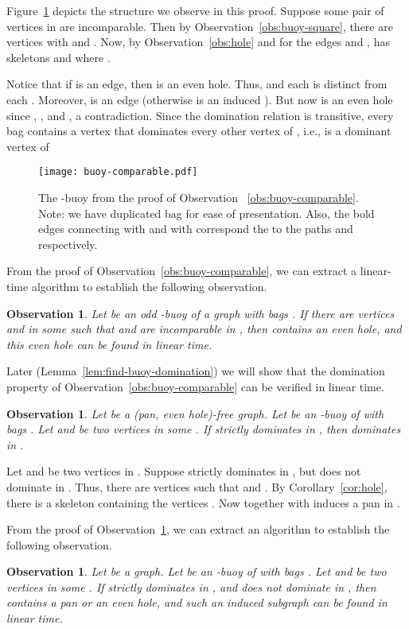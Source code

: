 \documentclass[11pt,a4paper]{article}
\def\qed{\hfill \vspace{2ex}}
\newtheorem{observation}[theorem]{Observation}
\newenvironment{proof}{\noindent {\it Proof:~}}{\hfill \smallskip\par}
\begin{document}
\begin{proof}
Figure~\ref{fig:comparable} depicts the structure we observe
in this proof.
Suppose some pair of vertices  in  are incomparable.
Then by Observation~\ref{obs:buoy-square}, there are
vertices  with 
and . Now, by Observation~\ref{obs:hole}
and for the edges  and ,  has skeletons
 and
 where .

Notice that if  is an edge, then  is an even hole.
Thus,  and each  is distinct from
each . Moreover,  is an edge (otherwise
 is an induced ). But now  is an even hole
since , , and
, a contradiction. Since the
domination relation is transitive, every bag  contains a
vertex  that dominates every other vertex of , i.e.,
 is a dominant vertex of 
\end{proof}
\begin{figure}[h]
\centering
\texttt{[image: buoy-comparable.pdf]}
\caption{The -buoy from the proof of Observation~
\ref{obs:buoy-comparable}. Note: we have duplicated bag
 for ease of presentation. Also, the bold edges
connecting  with  and  with 
correspond the to the paths  and  respectively.}
\label{fig:comparable}
\end{figure}
From the proof of Observation~\ref{obs:buoy-comparable}, we can
extract a linear-time algorithm to establish the following
observation.
\begin{observation}\label{obs:find-buoy-comparable}
Let  be an odd -buoy of a graph  with bags . If there are vertices  and  in
some  such that  and  are incomparable in , then 
contains an even hole, and this even hole can be found in linear
time. \qed
\end{observation}
Later (Lemma~\ref{lem:find-buoy-domination}) we will show that
the domination property of Observation~\ref{obs:buoy-comparable}
can be verified in linear time.
\begin{observation}\label{obs:buoy-pan}
Let  be a (pan, even hole)-free graph. Let  be an
-buoy of  with bags . Let  and 
be two vertices in some . If  strictly dominates  in
, then  dominates  in .
\end{observation}
\begin{proof}
Let  and  be two vertices in . Suppose  strictly dominates
 in , but  does not dominate  in .
Thus, there are vertices  such that
 and . By
Corollary~\ref{cor:hole}, there is a skeleton  containing the
vertices . Now  together with  induces a pan in
.
\end{proof}


From the proof of Observation~\ref{obs:buoy-pan}, we can extract
an algorithm to establish the following observation.
\begin{observation}\label{obs:find-buoy-pan}
Let  be a graph. Let  be an -buoy of  with bags
. Let  and  be two vertices in some
. If  strictly dominates  in , and  does
not dominate  in , then  contains a pan or an even
hole, and such an induced subgraph can be found in linear time.
\hfill 
\end{observation}
\end{document}
